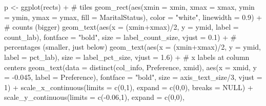 \documentclass[
  letterpaper,
  DIV=11,
  numbers=noendperiod]{scrreprt}
\newenvironment{Shaded}{\begin{snugshade}}{\end{snugshade}}
\newcommand{\AttributeTok}[1]{\textcolor[rgb]{0.40,0.45,0.13}{#1}}
\newcommand{\CommentTok}[1]{\textcolor[rgb]{0.37,0.37,0.37}{#1}}
\newcommand{\ConstantTok}[1]{\textcolor[rgb]{0.56,0.35,0.01}{#1}}
\newcommand{\DecValTok}[1]{\textcolor[rgb]{0.68,0.00,0.00}{#1}}
\newcommand{\FloatTok}[1]{\textcolor[rgb]{0.68,0.00,0.00}{#1}}
\newcommand{\FunctionTok}[1]{\textcolor[rgb]{0.28,0.35,0.67}{#1}}
\newcommand{\NormalTok}[1]{\textcolor[rgb]{0.00,0.23,0.31}{#1}}
\newcommand{\OtherTok}[1]{\textcolor[rgb]{0.00,0.23,0.31}{#1}}
\newcommand{\SpecialCharTok}[1]{\textcolor[rgb]{0.37,0.37,0.37}{#1}}
\newcommand{\StringTok}[1]{\textcolor[rgb]{0.13,0.47,0.30}{#1}}
\begin{document}
\begin{Shaded}
\begin{Highlighting}[]
\NormalTok{p }\OtherTok{\textless{}{-}} \FunctionTok{ggplot}\NormalTok{(rects) }\SpecialCharTok{+}
  \CommentTok{\# tiles}
  \FunctionTok{geom\_rect}\NormalTok{(}\FunctionTok{aes}\NormalTok{(}\AttributeTok{xmin =}\NormalTok{ xmin, }\AttributeTok{xmax =}\NormalTok{ xmax, }\AttributeTok{ymin =}\NormalTok{ ymin, }\AttributeTok{ymax =}\NormalTok{ ymax,}
                \AttributeTok{fill =}\NormalTok{ MaritalStatus),}
            \AttributeTok{color =} \StringTok{"white"}\NormalTok{, }\AttributeTok{linewidth =} \FloatTok{0.9}\NormalTok{) }\SpecialCharTok{+}
  \CommentTok{\# counts (bigger)}
  \FunctionTok{geom\_text}\NormalTok{(}\FunctionTok{aes}\NormalTok{(}\AttributeTok{x =}\NormalTok{ (xmin}\SpecialCharTok{+}\NormalTok{xmax)}\SpecialCharTok{/}\DecValTok{2}\NormalTok{, }\AttributeTok{y =}\NormalTok{ ymid, }\AttributeTok{label =}\NormalTok{ count\_lab),}
            \AttributeTok{fontface =} \StringTok{"bold"}\NormalTok{, }\AttributeTok{size =}\NormalTok{ label\_count\_size, }\AttributeTok{vjust =} \FloatTok{0.1}\NormalTok{) }\SpecialCharTok{+}
  \CommentTok{\# percentages (smaller, just below)}
  \FunctionTok{geom\_text}\NormalTok{(}\FunctionTok{aes}\NormalTok{(}\AttributeTok{x =}\NormalTok{ (xmin}\SpecialCharTok{+}\NormalTok{xmax)}\SpecialCharTok{/}\DecValTok{2}\NormalTok{, }\AttributeTok{y =}\NormalTok{ ymid, }\AttributeTok{label =}\NormalTok{ pct\_lab),}
            \AttributeTok{size =}\NormalTok{ label\_pct\_size, }\AttributeTok{vjust =} \FloatTok{1.6}\NormalTok{) }\SpecialCharTok{+}
  \CommentTok{\# x labels at column centers}
  \FunctionTok{geom\_text}\NormalTok{(}\AttributeTok{data =} \FunctionTok{distinct}\NormalTok{(col\_info, Preference, xmid),}
            \FunctionTok{aes}\NormalTok{(}\AttributeTok{x =}\NormalTok{ xmid, }\AttributeTok{y =} \SpecialCharTok{{-}}\FloatTok{0.045}\NormalTok{, }\AttributeTok{label =}\NormalTok{ Preference),}
            \AttributeTok{fontface =} \StringTok{"bold"}\NormalTok{, }\AttributeTok{size =}\NormalTok{ axis\_text\_size}\SpecialCharTok{/}\DecValTok{3}\NormalTok{, }\AttributeTok{vjust =} \DecValTok{1}\NormalTok{) }\SpecialCharTok{+}
  \FunctionTok{scale\_x\_continuous}\NormalTok{(}\AttributeTok{limits =} \FunctionTok{c}\NormalTok{(}\DecValTok{0}\NormalTok{,}\DecValTok{1}\NormalTok{), }\AttributeTok{expand =} \FunctionTok{c}\NormalTok{(}\DecValTok{0}\NormalTok{,}\DecValTok{0}\NormalTok{), }\AttributeTok{breaks =} \ConstantTok{NULL}\NormalTok{) }\SpecialCharTok{+}
  \FunctionTok{scale\_y\_continuous}\NormalTok{(}\AttributeTok{limits =} \FunctionTok{c}\NormalTok{(}\SpecialCharTok{{-}}\FloatTok{0.06}\NormalTok{,}\DecValTok{1}\NormalTok{), }\AttributeTok{expand =} \FunctionTok{c}\NormalTok{(}\DecValTok{0}\NormalTok{,}\DecValTok{0}\NormalTok{),}

\end{Highlighting}
\end{Shaded}
\end{document}
